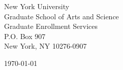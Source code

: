 \begin{minipage}{0.49\textwidth}
\begin{flushleft}
\noindent
New York University\\
Graduate School of Arts and Science\\
Graduate Enrollment Services\\
P.O. Box 907\\
New York, NY 10276-0907\\
\end{flushleft}
\end{minipage}
\begin{minipage}{0.47\textwidth}
\begin{flushright}
\today
\end{flushright}
\end{minipage} \\

\newcommand{\univ}{New York University}
\newcommand{\univshort}{NYU}
\newcommand{\degree}{Ph.D.}
\newcommand{\dept}{Computer Science}



